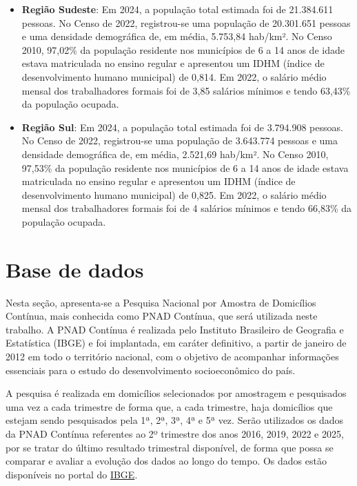 \documentclass[12pt,a4paper,header]{abnt}
\begin{document}
\begin{itemize}
    \item \textbf{Região Sudeste}: Em 2024, a população total estimada foi de 21.384.611 pessoas. No Censo de 2022, registrou-se uma população de 20.301.651 pessoas e uma densidade demográfica de, em média, 5.753,84 hab/km². No Censo 2010, 97,02\% da população residente nos municípios de 6 a 14 anos de idade estava matriculada no ensino regular e apresentou um IDHM (índice de desenvolvimento humano municipal) de 0,814. Em 2022, o salário médio mensal dos trabalhadores formais foi de 3,85 salários mínimos e tendo 63,43\% da população ocupada.
    
    \item \textbf{Região Sul}: Em 2024, a população total estimada foi de 3.794.908 pessoas. No Censo de 2022, registrou-se uma população de 3.643.774 pessoas e uma densidade demográfica de, em média, 2.521,69 hab/km². No Censo 2010, 97,53\% da população residente nos municípios de 6 a 14 anos de idade estava matriculada no ensino regular e apresentou um IDHM (índice de desenvolvimento humano municipal) de 0,825. Em 2022, o salário médio mensal dos trabalhadores formais foi de 4 salários mínimos e tendo 66,83\% da população ocupada.
\end{itemize}


\section{Base de dados} \label{sec:base_de_dados}
Nesta seção, apresenta-se a Pesquisa Nacional por Amostra de Domicílios Contínua, mais conhecida como PNAD Contínua, que será utilizada neste trabalho. A PNAD Contínua é realizada pelo Instituto Brasileiro de Geografia e Estatística (IBGE) e foi implantada, em caráter definitivo, a partir de janeiro de 2012 em todo o território nacional, com o objetivo de acompanhar informações essenciais para o estudo do desenvolvimento socioeconômico do país.

A pesquisa é realizada em domicílios selecionados por amostragem e pesquisados uma vez a cada trimestre de forma que, a cada trimestre, haja domicílios que estejam sendo pesquisados pela 1ª, 2ª, 3ª, 4ª e 5ª vez. Serão utilizados os dados da PNAD Contínua referentes ao 2º trimestre dos anos 2016, 2019, 2022 e 2025, por se tratar do último resultado trimestral disponível, de forma que possa se comparar e avaliar a evolução dos dados ao longo do tempo. Os dados estão disponíveis no portal do \href{https://ftp.ibge.gov.br/Trabalho_e_Rendimento/Pesquisa_Nacional_por_Amostra_de_Domicilios_continua/Trimestral/Microdados/}{IBGE}.
\end{document}

